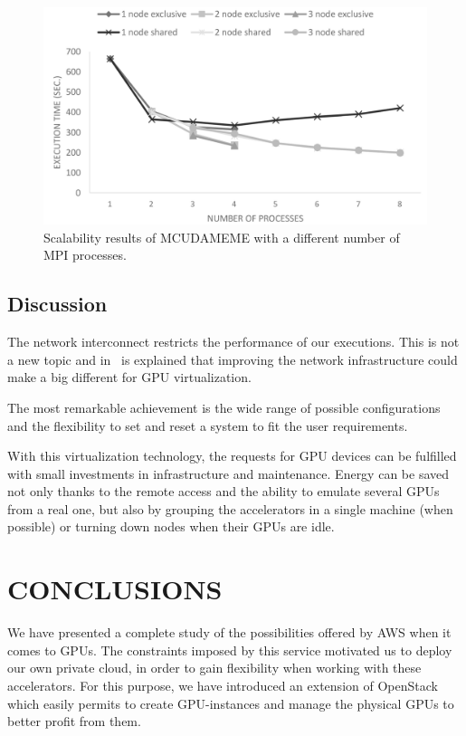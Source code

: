 \documentclass[a4paper,twoside]{article}
\begin{document}
\begin{figure}[htb]
  \centering
  \includegraphics[width=\linewidth]{images/mcudameme-os.pdf}
  \caption{Scalability results of MCUDAMEME with a different number of MPI processes.}
  \label{fig3}
\end{figure}

\subsection{Discussion}
The network interconnect restricts the performance of our executions.
This is not a new topic and in~\cite{tonithesis} is explained that improving the network infrastructure could make a big different for GPU virtualization.

The most remarkable achievement is the wide range of possible configurations and the flexibility to set and reset a system to fit the 
user requirements. 

With this virtualization technology, the requests for GPU devices can be fulfilled with small investments in infrastructure and maintenance.
Energy can be saved not only thanks to the remote access and the ability to emulate several GPUs from a real one, but also  by grouping the accelerators in a single machine (when possible) or turning down nodes when their GPUs are idle. 

\section{\uppercase{Conclusions}}
\label{sec:conclusions}
We have presented a complete study of the possibilities offered by AWS when it comes to GPUs. 
The constraints imposed by this service motivated us to deploy our own private cloud, in order to gain flexibility when working with these accelerators.
For this purpose, we have introduced an extension of OpenStack which easily permits to create GPU-instances and manage the physical GPUs to better profit from them.
\end{document}
